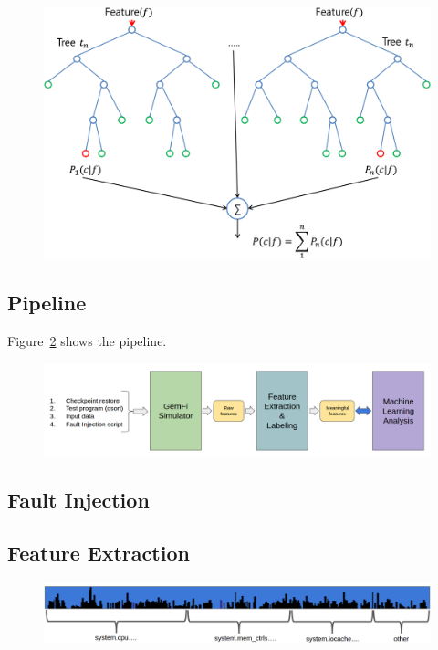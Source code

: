 \documentclass{sig-alternate}
\begin{document}
\begin{figure}[t]
\begin{center}
   \includegraphics[width=0.95\linewidth]{./figures/rf.png}
\end{center}
   \caption{}
\label{fig:rf}
\end{figure}

\subsection{Pipeline}
Figure~\ref{fig:pipeline} shows the pipeline.
\begin{figure}[t]
\begin{center}
   \includegraphics[width=0.95\linewidth]{./figures/pipeline.png}
\end{center}
   \caption{}
\label{fig:pipeline}
\end{figure}

\subsection{Fault Injection}

\subsection{Feature Extraction}

\begin{figure}[t]
\begin{center}
   \includegraphics[width=0.95\linewidth]{./figures/feat_dist.png}
\end{center}
   \caption{}
\label{fig:feat-dist}
\end{figure}
\end{document}
